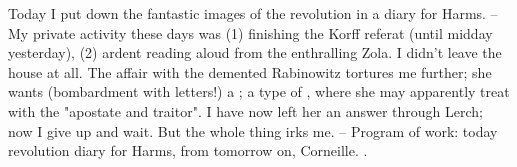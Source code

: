 
Today I put down the fantastic images of the revolution in a diary for Harms. -- My private activity these days was (1) finishing the Korff referat (until midday yesterday), (2) ardent reading aloud from the enthralling Zola. I didn't leave the house at all. The affair with the demented Rabinowitz tortures me further; she wants (bombardment with letters!) a ;  a type of , where she may apparently treat with the "apostate and traitor". I have now left her an answer through Lerch; now I give up and wait. But the whole thing irks me. -- Program of work: today revolution diary for Harms, from tomorrow on, Corneille. .

